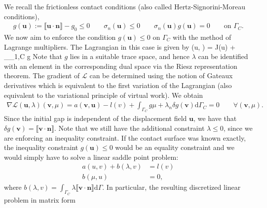\documentclass[12pt]{article}
\newenvironment{alignno}{\linenomath\align}{\endalign\linenomath}
\newcommand{\mbf}[1]{\mathbf{#1}}
\newcommand{\mrm}[1]{\mathrm{#1}}
\newcommand{\mcl}[1]{\mathcal{#1}}
\newcommand{\mbn}{\mbf{n}}
\newcommand{\mbu}{\mbf{u}}
\newcommand{\mbv}{\mbf{v}}
\newcommand{\md}{\mrm{d}}
\newcommand{\jump}[1]{\llbracket #1 \rrbracket}
\begin{document}
We recall the frictionless contact conditions (also called Hertz-Signorini-Moreau conditions),
\begin{align*}
    g(\bm u):=  \jump{\bm u \cdot \bm n} -g_0\leq 0 \qquad \sigma_n(\mbu)\leq 0 \qquad \sigma_n(\mbu)g(\mbu) = 0 \qquad \text{on } \Gamma_C.
\end{align*}
We now aim to enforce the condition $g(\bm u) \leq 0$ on $\Gamma_C$ with the method of Lagrange multipliers. The Lagrangian in this case is given by
\begin{alignno}
  \mcl{L}(\bm u, \lambda ) = J(\bm u) + \int_{\Gamma_{1,C}} \lambda g\md \Gamma
\end{alignno}
Note that $g$ lies in a suitable trace space, and hence $\lambda$ can be identified with an element in the corresponding dual space via the Riesz representation theorem.
The gradient of $\mcl{L}$ can be determined using the notion of Gateaux derivatives which is equivalent to the first variation of the Lagrangian (also equivalent to the variational principle of virtual work). We obtain
\begin{align*}
  \nabla \mcl{L}(\bm u, \lambda)(\bm v, \mu) = a(\bm v, \bm u)-l(v)+ \int_{\Gamma_C}g \mu + \lambda_n \delta g(\bm v) \md \Gamma_C = 0 \qquad \forall (\bm v, \mu).
\end{align*}
Since the initial gap is independent of the displacement field $\mbu$, we have that $\delta g(\mbv) =  \jump{\mbv \cdot \mbn}$.
Note that we still have the additional constraint $\lambda \leq 0$, since we are enforcing an inequality constraint.
If the contact surface was known exactly, the inequality constraint $g(\bm u ) \leq 0$ would be an equality constraint and we would simply have to solve a linear saddle point problem:
\begin{align*}
  a(u,v) + b(\lambda, v) &= l(v)\\
  b(\mu, u)&=0,
\end{align*}
where $b(\lambda, v)  =  \int_{\Gamma_C}\lambda \jump{\mbv \cdot \mbn} \md \Gamma$.
In particular, the resulting discretized linear problem in matrix form
\end{document}
